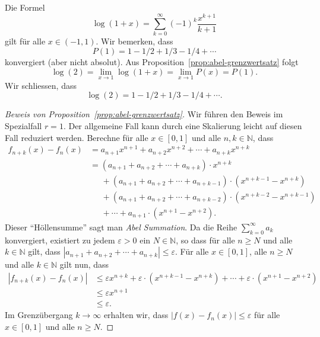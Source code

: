 \documentclass[../main.tex]{subfiles}
\begin{document}
\begin{example}
  Die Formel
  \[
    \log(1 + x) = \sum_{k=0}^{\infty} {(-1)}^k \frac{x^{k+1}}{k+1}
  \]
  gilt für alle $x \in (-1, 1)$.
  Wir bemerken, dass
  \[
    P(1) = 1 - 1/2 + 1/3 - 1/4 + \cdots
  \]
  konvergiert (aber nicht absolut).
  Aus Proposition~\ref{prop:abel-grenzwertsatz} folgt
  \[
    \log(2) = \lim_{x \to 1} \log(1 + x)
    = \lim_{x \to 1} P(x) = P(1).
  \]
  Wir schliessen, dass
  \[
    \log(2) = 1 - 1/2 + 1/3 - 1/4 + \cdots.
  \]
\end{example}

\begin{proof}[Beweis von Proposition~\ref{prop:abel-grenzwertsatz}]
  Wir führen den Beweis im Spezialfall $r = 1$.
  Der allgemeine Fall kann durch eine Skalierung leicht auf diesen
  Fall reduziert werden.
  Berechne für alle $x \in [0, 1]$ und alle $n, k \in \mathbb{N}$, dass
  \begin{align*}
    f_{n+k}(x) - f_n(x) 
    &= a_{n+1}x^{n+1} + a_{n+2}x^{n+2} + \cdots + a_{n+k}x^{n+k} \\
    & = (a_{n+1} + a_{n+2} + \cdots + a_{n+k}) \cdot x^{n+k}\\
    &\;\;\;\;\; + (a_{n+1} + a_{n+2} + \cdots + a_{n+k-1}) \cdot (x^{n+k-1} - x^{n+k})\\
    &\;\;\;\;\; + (a_{n+1} + a_{n+2} + \cdots + a_{n+k - 2}) \cdot (x^{n+k-2} - x^{n+k-1})\\
    &\;\;\;\;\; + \cdots
    + a_{n+1} \cdot (x^{n+1} - x^{n+2}).
  \end{align*}
  Dieser ``Höllensumme'' sagt man \emph{Abel Summation}.
  Da die Reihe $\sum_{k=0}^{\infty} a_k$ konvergiert,
  existiert zu jedem $\varepsilon > 0$ ein $N \in \mathbb{N}$, so
  dass für alle $n \geq N$ und alle $k \in \mathbb{N}$ gilt, dass
  $|a_{n+1} + a_{n+2} + \cdots + a_{n+k}| \leq \varepsilon$.
  Für alle $x \in [0, 1]$, alle $n \geq N$ und alle $k \in \mathbb{N}$ gilt nun, dass
  \begin{align*}
    |f_{n+k}(x) - f_n(x)| 
    &\leq \varepsilon x^{n+k} +
    \varepsilon \cdot (x^{n+k-1} - x^{n+k}) + \cdots + \varepsilon \cdot (x^{n+1} - x^{n+2})\\
    &\leq \varepsilon x^{n+1}\\ & \leq \varepsilon.
  \end{align*}
  Im Grenzübergang $k \to \infty$ erhalten wir, dass $|f(x) - f_n(x)| \leq \varepsilon$
  für alle $x \in [0, 1]$ und alle $n \geq N$.
\end{proof}
\end{document}
